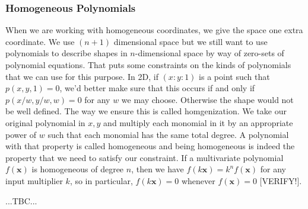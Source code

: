 
\subsubsection{Homogeneous Polynomials}
When we are working with homogeneous coordinates, we give the space one extra coordinate. We use $(n+1)$ dimensional space but we still want to use polynomials to describe shapes in $n$-dimensional space by way of zero-sets of polynomial equations. That puts some constraints on the kinds of polynomials that we can use for this purpose. In 2D, if $(x : y : 1)$ is a point such that $p(x,y,1) = 0$, we'd better make sure that this occurs if and only if $p(x/w, y/w, w) = 0$ for any $w$ we may choose. Otherwise the shape would not be well defined. The way we ensure this is called homgenization. We take our original polynomial in $x,y$ and multiply each monomial in it by an appropriate power of $w$ such that each monomial has the same total degree. A polynomial with that property is called homogeneous and being homogeneous is indeed the property that we need to satisfy our constraint. If a multivariate polynomial $f(\mathbf{x})$ is homogeneous of degree $n$, then we have $f(k \mathbf{x}) = k^n f(\mathbf{x})$ for any input multiplier $k$, so in particular, $f(k \mathbf{x}) = 0$ whenever $f(\mathbf{x}) = 0$ [VERIFY!].

...TBC...






